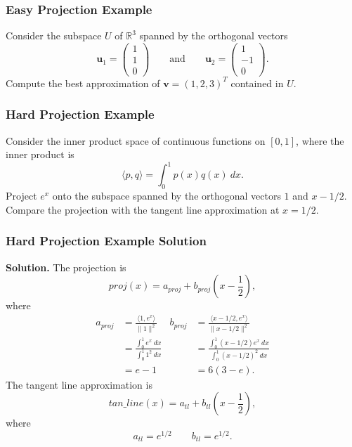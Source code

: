 \documentclass{beamer}
\begin{document}
\begin{frame}[t]
\frametitle{Easy Projection Example}
\begin{Example}
Consider the subspace $U$ of $\mathbb{R}^3$ spanned by the orthogonal vectors 
$$
{\boldsymbol u_1} = \left(\begin{array}{c} 1\\ 1\\ 0\end{array}\right)\qquad\text{and}\qquad {\boldsymbol u_2} = \left(\begin{array}{c} 1\\ -1\\ 0\end{array}\right).
$$
Compute the best approximation of ${\boldsymbol v} =(1, 2, 3)^T$ contained in $U$.
\end{Example}
\end{frame}

\begin{frame}[t]
\frametitle{Hard Projection Example}
\begin{Example}
Consider the inner product space of continuous functions on $[0, 1]$, where the inner product is
$$
\langle p, q\rangle = \int_0^1 p(x) q(x)\ dx.
$$
Project $e^x$ onto the subspace spanned by the orthogonal vectors $1$ and $x - 1/2$. Compare the projection with the tangent line approximation at $x = 1/2$.
\end{Example}
\end{frame}

\begin{frame}
\frametitle{Hard Projection Example Solution}
 {\tiny  {\bf Solution.} The projection is
$$
proj(x) = a_{proj}+ b_{proj} \left(x - \frac{1}{2}\right),
$$
where
\begin{align*}
a_{proj}	& = \frac{\langle 1, e^x\rangle}{\|1\|^2}		&	b_{proj} 	&= \frac{\langle x - 1/2, e^x\rangle}{\| x - 1/2 \|^2}\\
		& = \frac{\int_0^1 e^x\ dx}{\int_0^1 1^2\ dx}	&			&= \frac{ \int_0^1 (x - 1/2)e^x\ dx}{\int_0^1 (x - 1/2)^2\ dx} \\
		& = e - 1								&			&=  6(3 - e).
\end{align*}
The tangent line approximation is
$$
tan\_line(x) = a_{tl} + b_{tl} \left(x - \frac{1}{2}\right),
$$
where
$$
a_{tl} = e^{1/2}\qquad b_{tl} = e^{1/2}.
$$
}

\end{frame}
\end{document}
